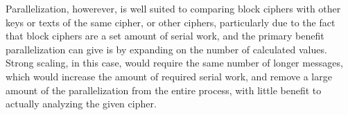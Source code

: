 \documentclass[11.5pt]{article}
\begin{document}
Parallelization, howerever, is well suited to comparing block ciphers with other keys or texts of the same cipher, or other ciphers, particularly due to the fact that block ciphers are a set amount of serial work, and the primary benefit parallelization can give is by expanding on the number of calculated values. Strong scaling, in this case, would require the same number of longer messages, which would increase the amount of required serial work, and remove a large amount of the parallelization from the entire process, with little benefit to actually analyzing the given cipher.
\end{document}
